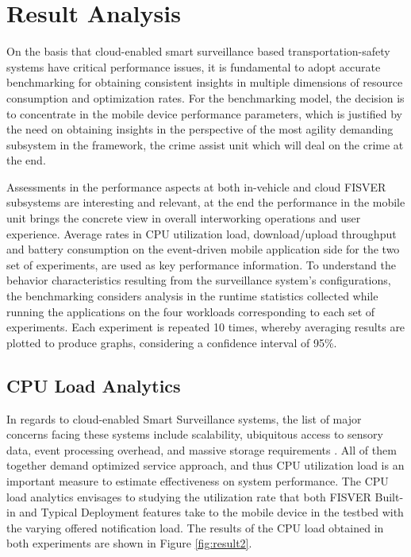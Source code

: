 \section{Result Analysis}

On the basis that cloud-enabled smart surveillance based transportation-safety systems have critical performance issues, it is fundamental to adopt accurate benchmarking for obtaining consistent insights in multiple dimensions of resource consumption and optimization rates\cite{Evaluation5}. For the benchmarking model, the decision is to concentrate in the mobile device performance parameters, which is justified by the need on  obtaining insights in the perspective of the most agility demanding subsystem in the framework, the crime assist unit which will deal on the crime at the end.  

Assessments in the performance aspects at both in-vehicle and cloud FISVER subsystems are interesting and relevant, at the end the performance in the mobile unit brings the concrete view in overall interworking operations and user experience. Average rates in CPU utilization load, download/upload throughput and battery consumption on the event-driven mobile application side for the two set of experiments, are used as key performance information. To understand the behavior characteristics resulting from the surveillance system’s configurations, the benchmarking considers analysis in the runtime statistics collected while running the applications on the four workloads corresponding to each set of experiments. Each experiment is repeated 10 times, whereby averaging results are plotted to produce graphs, considering a confidence interval of 95\%.

\subsection{CPU Load Analytics}
\label{CPUAnalytics}

In regards to cloud-enabled Smart Surveillance systems, the list of major concerns facing these systems include scalability, ubiquitous access to sensory data, event processing overhead, and massive storage requirements \cite{Anwar_Hossain}. All of them together demand optimized service approach, and thus CPU utilization load is an important measure to estimate effectiveness on system performance. The CPU load analytics envisages to studying the utilization rate that both FISVER Built-in and Typical Deployment features take to the mobile device in the testbed with the varying offered notification load. The results of the CPU load obtained in both experiments are shown in Figure \ref{fig:result2}.

